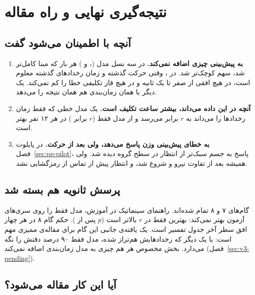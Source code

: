 \section{نتیجه‌گیری نهایی و راه مقاله}
\label{sec:final}

\subsection{آنچه با اطمینان می‌شود گفت}

\begin{enumerate}
\item \textbf{ به پیش‌بینی  چیزی اضافه نمی‌کند.} در سه نسل مدل (،  و ) هر بار که مبنا کامل‌تر شد، سهم  کوچک‌تر شد. در ، وقتی حرکت گذشته و زمان رخدادهای گذشته معلوم است،  در هیچ افقی از صفر تا یک ثانیه و در هیچ فاز تکلیفی خطا را کم نمی‌کند.  یک  دیگر با همان زمان‌بندی هم همان نتیجه را می‌دهد.
\item \textbf{آنچه  در این داده می‌داند، بیشتر ساعت تکلیف است.} یک مدل خطی که فقط زمان رخدادها را می‌داند به $r$ برابر  می‌رسد و از مدل فقط‌ ($r$ برابر ) در هر ۱۲ نفر بهتر است.
\item \textbf{ به خطای پیش‌بینی وزن پاسخ می‌دهد، ولی بعد از حرکت.} در پایلوت فصل~\ref{sec:pe-pilot}، پاسخ  به جسم سبک‌تر از انتظار در سطح گروه دیده شد. ولی همیشه بعد از تفاوت نیرو و  شروع شد، و انتظار پیش از تماس از  رمزگشایی نشد.
\end{enumerate}

\subsection{پرسش ثانویه هم بسته شد}

گام‌های ۷ و ۸  تمام شده‌اند. راهنمای سینماتیک در آموزش، مدل فقط‌ را روی سری‌های آزمون بهتر نمی‌کند: بهترین  فقط  در $r$ بالاتر است ($p$ پس از  ). حکم گام ۸ در هر چهار افق سطر آخر جدول تفسیر است. یک یافته‌ی جانبی این گام برای مقاله‌ی ممیزی مهم است: با  یک  دیگر که رخدادهایش هم‌تراز شده، مدل فقط‌ ۹۰ درصد دقتش را نگه می‌دارد. بخش مخصوص هر  هم چیزی به مدل زمان‌بندی  اضافه نمی‌کند (فصل~\ref{sec:v3-pending}).

\subsection{آیا این کار مقاله می‌شود؟}

